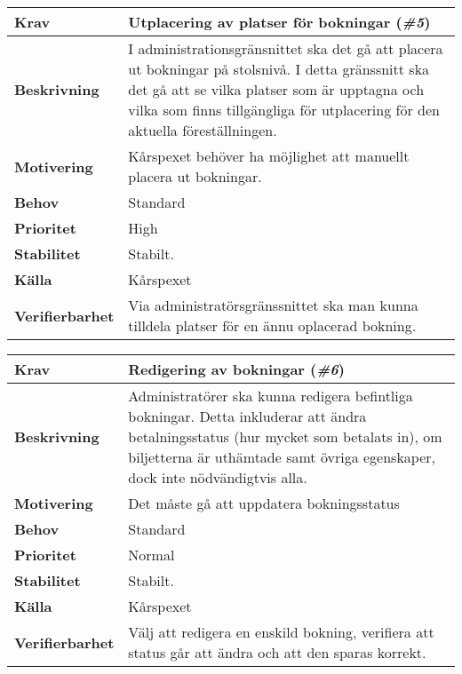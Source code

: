 \documentclass[a4paper, twoside, 11pt, titlepage]{article}
\begin{document}
	\begin{tabular} { p{2.6cm} p{12.5cm} }
		\hline
		\sffamily\textbf{Krav} & Utplacering av platser för bokningar (\emph{\#5})  \\
		\hline
		\sffamily\textbf{Beskrivning} & I administrationsgränsnittet ska det gå att placera ut bokningar på stolsnivå. I detta gränssnitt ska det gå att se vilka platser som är upptagna och vilka som finns tillgängliga för utplacering för den aktuella föreställningen.  \\
		\hline
		\sffamily\textbf{Motivering} & Kårspexet behöver ha möjlighet att manuellt placera ut bokningar.  \\
		\hline
		\sffamily\textbf{Behov} & Standard  \\
		\hline
		\sffamily\textbf{Prioritet} & High  \\
		\hline
		\sffamily\textbf{Stabilitet} & Stabilt.  \\
		\hline
		\sffamily\textbf{Källa} & Kårspexet  \\
		\hline
		\sffamily\textbf{Verifierbarhet} & Via administratörsgränssnittet ska man kunna tilldela platser för en ännu oplacerad bokning.  \\
		\hline
	\end{tabular}
	\vspace{6mm}

	\begin{tabular} { p{2.6cm} p{12.5cm} }
		\hline
		\sffamily\textbf{Krav} & Redigering av bokningar (\emph{\#6})  \\
		\hline
		\sffamily\textbf{Beskrivning} & Administratörer ska kunna redigera befintliga bokningar. Detta inkluderar att ändra betalningsstatus (hur mycket som betalats in), om biljetterna är uthämtade samt övriga egenskaper, dock inte nödvändigtvis alla.  \\
		\hline
		\sffamily\textbf{Motivering} & Det måste gå att uppdatera bokningsstatus  \\
		\hline
		\sffamily\textbf{Behov} & Standard  \\
		\hline
		\sffamily\textbf{Prioritet} & Normal  \\
		\hline
		\sffamily\textbf{Stabilitet} & Stabilt.  \\
		\hline
		\sffamily\textbf{Källa} & Kårspexet  \\
		\hline
		\sffamily\textbf{Verifierbarhet} & Välj att redigera en enskild bokning, verifiera att status går att ändra och att den sparas korrekt.  \\
		\hline
	\end{tabular}
	\vspace{6mm}
\end{document}
